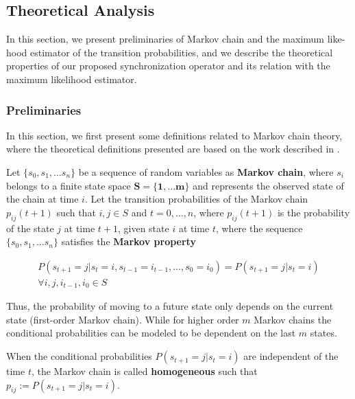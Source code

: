 


\subsection{Theoretical Analysis}
\label{sec:theoretical}
 In this section, we present preliminaries of Markov chain and the maximum like-hood estimator of the transition probabilities, and we describe the theoretical properties of our proposed synchronization operator and its relation with the maximum likelihood estimator. 
 
 
 \subsubsection*{Preliminaries}
 In this section, we first present some definitions related to Markov chain theory, 
where the theoretical definitions presented  are based 
on the work described in \cite{bertsekas2002introduction,Billingsley1961,anderson1957statistical,howard2012dynamic}.

\begin{definition}
	Let $\{s_0, s_1, \ldots s_n\}$ be a sequence of random variables as \textbf{Markov chain}, where $s_i$ belongs to a finite state space $\mathbf{S =\{1,\ldots m\}}$ and represents the observed state of the chain at time $i$. Let the transition probabilities of the Markov chain $p_{ij}(t+1)$ such that $i,j \in S$ and $t=0,\ldots, n$, where  $p_{ij}(t+1)$ is the probability of the state $j$ at time $t+1$, given state $i$ at time $t$, where the sequence $\{s_0, s_1, \ldots s_n\}$ satisfies the \textbf{Markov property} 
	
	\begin{equation}
	\begin{aligned}
	P(s_{t+1}=j|s_{t}=i,s_{t-1}=i_{t-1},\ldots ,s_{0}=i_{0})=P(s_{t+1}=j|s_{t}=i)\\
	\forall i,j,i_{t-1},i_{0} \in S
	\end{aligned}
	\end{equation}

	
	Thus, the probability of moving to a future state only depends on the current  state (first-order Markov chain). While for higher order $m$ Markov chains the conditional probabilities can be modeled to be dependent on the last $m$ states. 
	
	When the conditional probabilities $P(s_{t+1}=j|s_{t}=i)$ are independent of the time $t$, the Markov chain is called \textbf{homogeneous} such that $p_{ij}:=P(s_{t+1}=j|s_{t}=i)$.
	

	
\end{definition}

